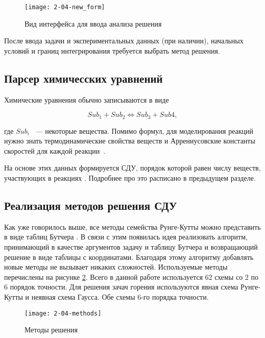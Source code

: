 \begin{figure}
    \texttt{[image: 2-04-new\_form]}
    \caption{Вид интерфейса для ввода анализа решения}
    \label{fig:forma1}
\end{figure}

После ввода задачи и экспериментальных данных (при наличии), начальных условий и границ интегрирования требуется выбрать метод решения.

\subsection{Парсер химичесских уравнений}

Химические уравнения обычно записываются в виде

\begin{equation}
    Sub_1 + Sub_2 \Longleftrightarrow Sub_3 + Sub4,
    \label{eq:Chemic}
\end{equation}

где $Sub_i$ ~--- некоторые вещества. Помимо формул, для моделирования реакций нужно знать термодинамические свойства веществ и Аррениусовские константы скоростей для каждой реакции~\cite{book3}.

На основе этих данных формируется СДУ, порядок которой равен числу веществ, участвующих в реакциях \cite{Article5}. Подробнее про это расписано в предыдущем разделе.

\subsection{Реализация методов решения СДУ}

Как уже говорилось выше, все методы семейства Рунге-Кутты можно представить в виде таблиц Бутчера \cite{cite_1_3}. В связи с этим появилась идея реализовать алгоритм, принимающий в качестве аргументов задачу и таблицу Бутчера и возвращающий решение в виде таблицы с координатами. Благодаря этому алгоритму добавлять новые методы не вызывает никаких сложностей. Используемые методы перечислены на рисунке \ref{fig:SolveMethods}. Всего в данной работе используется 62 схемы со 2 по 6 порядок точности. Для решения зачач горения используются явная схема Рунге-Кутты и неявная схема Гаусса. Обе схемы 6-го порядка точности.

\begin{figure}
    \texttt{[image: 2-04-methods]}
    \caption{Методы решения}
    \label{fig:SolveMethods}
\end{figure}

